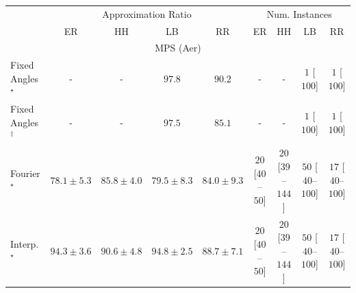 \begin{tabular}{l|cccc|cccc|}
\toprule
& \multicolumn{4}{c|}{Approximation Ratio} & \multicolumn{4}{c|}{Num. Instances} \\
            & ER & HH & LB & RR & ER & HH & LB & RR \\
\midrule
\multicolumn{9}{c}{\rule{0pt}{8pt}MPS (Aer)} \\
\midrule
Fixed Angles$^\star$ & {\cellcolor[HTML]{000000}} \color[HTML]{F1F1F1} {\cellcolor{white}} \color{black} - & {\cellcolor[HTML]{000000}} \color[HTML]{F1F1F1} {\cellcolor{white}} \color{black} - & {\cellcolor[HTML]{520150}} \color[HTML]{F1F1F1} $97.8$ & {\cellcolor[HTML]{84248A}} \color[HTML]{F1F1F1} $90.2$ & {\cellcolor[HTML]{000000}} \color[HTML]{F1F1F1} {\cellcolor{white}} \color{black} - & {\cellcolor[HTML]{000000}} \color[HTML]{F1F1F1} {\cellcolor{white}} \color{black} - & {\cellcolor[HTML]{FFF7F3}} \color[HTML]{000000} $1$ [$100$] & {\cellcolor[HTML]{FFF7F3}} \color[HTML]{000000} $1$ [$100$] \\
Fixed Angles$^\dagger$ & {\cellcolor[HTML]{000000}} \color[HTML]{F1F1F1} {\cellcolor{white}} \color{black} - & {\cellcolor[HTML]{000000}} \color[HTML]{F1F1F1} {\cellcolor{white}} \color{black} - & {\cellcolor[HTML]{550253}} \color[HTML]{F1F1F1} $97.5$ & {\cellcolor[HTML]{894FA3}} \color[HTML]{F1F1F1} $85.1$ & {\cellcolor[HTML]{000000}} \color[HTML]{F1F1F1} {\cellcolor{white}} \color{black} - & {\cellcolor[HTML]{000000}} \color[HTML]{F1F1F1} {\cellcolor{white}} \color{black} - & {\cellcolor[HTML]{FFF7F3}} \color[HTML]{000000} $1$ [$100$] & {\cellcolor[HTML]{FFF7F3}} \color[HTML]{000000} $1$ [$100$] \\
Fourier$^\star$ & {\cellcolor[HTML]{8C81BC}} \color[HTML]{F1F1F1} $78.1\pm 5.3$ & {\cellcolor[HTML]{8949A1}} \color[HTML]{F1F1F1} $85.8\pm 4.0$ & {\cellcolor[HTML]{8C78B7}} \color[HTML]{F1F1F1} $79.5\pm 8.3$ & {\cellcolor[HTML]{8A56A7}} \color[HTML]{F1F1F1} $84.0\pm 9.3$ & {\cellcolor[HTML]{FFF3EF}} \color[HTML]{000000} $20$ [$40$--$50$] & {\cellcolor[HTML]{FFF3EF}} \color[HTML]{000000} $20$ [$39$--$144$] & {\cellcolor[HTML]{FEEBE8}} \color[HTML]{000000} $50$ [$40$--$100$] & {\cellcolor[HTML]{FFF3F0}} \color[HTML]{000000} $17$ [$40$--$100$] \\
Interp.$^\star$ & {\cellcolor[HTML]{710A6D}} \color[HTML]{F1F1F1} $94.3\pm 3.6$ & {\cellcolor[HTML]{832088}} \color[HTML]{F1F1F1} $90.6\pm 4.8$ & {\cellcolor[HTML]{6E096A}} \color[HTML]{F1F1F1} $94.8\pm 2.5$ & {\cellcolor[HTML]{863092}} \color[HTML]{F1F1F1} $88.7\pm 7.1$ & {\cellcolor[HTML]{FFF3EF}} \color[HTML]{000000} $20$ [$40$--$50$] & {\cellcolor[HTML]{FFF3EF}} \color[HTML]{000000} $20$ [$39$--$144$] & {\cellcolor[HTML]{FEEBE8}} \color[HTML]{000000} $50$ [$40$--$100$] & {\cellcolor[HTML]{FFF3F0}} \color[HTML]{000000} $17$ [$40$--$100$] \\

\end{tabular}
